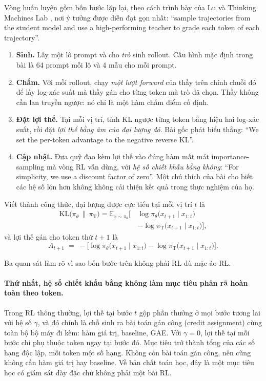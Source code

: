 Vòng huấn luyện gồm bốn bước lặp lại, theo cách trình bày của Lu và Thinking Machines Lab \cite{lu2025opd}, nơi ý tưởng được diễn đạt gọn nhất: ``sample trajectories from the student model and use a high-performing teacher to grade each token of each trajectory''.

\begin{enumerate}
	\item \textbf{Sinh.} Lấy một lô prompt và cho \emph{trò} sinh rollout. Cấu hình mặc định trong bài là 64 prompt mỗi lô và 4 mẫu cho mỗi prompt.
	\item \textbf{Chấm.} Với mỗi rollout, chạy \emph{một lượt forward} của thầy trên chính chuỗi đó để lấy log-xác suất mà thầy gán cho từng token mà trò đã chọn. Thầy không cần lan truyền ngược: nó chỉ là một hàm chấm điểm cố định.
	\item \textbf{Đặt lợi thế.} Tại mỗi vị trí, tính KL ngược từng token bằng hiệu hai log-xác suất, rồi đặt \emph{lợi thế bằng âm của đại lượng đó}. Bài gốc phát biểu thẳng: ``We set the per-token advantage to the negative reverse KL''.
	\item \textbf{Cập nhật.} Đưa quỹ đạo kèm lợi thế vào đúng hàm mất mát importance-sampling mà vòng RL vẫn dùng, với \emph{hệ số chiết khấu bằng không}: ``For simplicity, we use a discount factor of zero''. Một chú thích của bài cho biết các hệ số lớn hơn không không cải thiện kết quả trong thực nghiệm của họ.
\end{enumerate}

Viết thành công thức, đại lượng được cực tiểu tại mỗi vị trí $t$ là
\[
\begin{aligned}
\mathrm{KL}\big(\pi_\theta \,\big\|\, \pi_{\mathrm{T}}\big)
= \mathbb{E}_{x\sim\pi_\theta}\Big[\,&\log \pi_\theta\big(x_{t+1}\mid x_{1:t}\big) \\
 &- \log \pi_{\mathrm{T}}\big(x_{t+1}\mid x_{1:t}\big)\Big],
\end{aligned}
\]
và lợi thế gán cho token thứ $t+1$ là
\[
A_{t+1} \;=\; -\Big[\log \pi_\theta\big(x_{t+1}\mid x_{1:t}\big) - \log \pi_{\mathrm{T}}\big(x_{t+1}\mid x_{1:t}\big)\Big].
\]

Ba quan sát làm rõ vì sao bốn bước trên không phải RL dù mặc áo RL.

\paragraph{Thứ nhất, hệ số chiết khấu bằng không làm mục tiêu phân rã hoàn toàn theo token.} Trong RL thông thường, lợi thế tại bước $t$ gộp phần thưởng ở mọi bước tương lai với hệ số $\gamma$, và đó chính là chỗ sinh ra bài toán gán công (credit assignment) cùng toàn bộ bộ máy đi kèm: hàm giá trị, baseline, GAE. Với $\gamma = 0$, lợi thế tại mỗi bước chỉ phụ thuộc token ngay tại bước đó. Mục tiêu trở thành tổng của các số hạng độc lập, mỗi token một số hạng. Không còn bài toán gán công, nên cũng không cần hàm giá trị hay baseline. Về bản chất toán học, đây là một mục tiêu học có giám sát dày đặc chứ không phải một bài RL.

